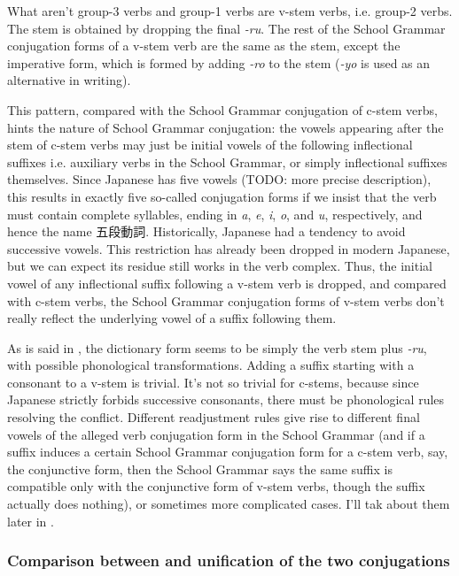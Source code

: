 \documentclass[UTF8, a4paper, oneside, scheme=plain]{ctexart}
\newcommand{\corpus}[1]{\emph{#1}}
\begin{document}
What aren't group-3 verbs and group-1 verbs are v-stem verbs, i.e. group-2 verbs.
The stem is obtained by dropping the final \corpus{-ru}.
The rest of the School Grammar conjugation forms of a v-stem verb are the same as the stem,
except the imperative form,
which is formed by adding \corpus{-ro} to the stem 
(\corpus{-yo} is used as an alternative in writing).

This pattern, compared with the School Grammar conjugation of c-stem verbs, 
hints the nature of School Grammar conjugation:
the vowels appearing after the stem of c-stem verbs 
may just be initial vowels of the following inflectional suffixes 
i.e. auxiliary verbs in the School Grammar,
or simply inflectional suffixes themselves.
Since Japanese has five vowels (TODO: more precise description),
this results in exactly five so-called conjugation forms
if we insist that the verb must contain complete syllables,
ending in \corpus{a}, \corpus{e}, \corpus{i}, \corpus{o}, and \corpus{u}, respectively,
and hence the name 五段動詞.
Historically, Japanese had a tendency to avoid successive vowels.
This restriction has already been dropped in modern Japanese,
but we can expect its residue still works in the verb complex.
Thus, the initial vowel of any inflectional suffix following a v-stem verb is dropped,
and compared with c-stem verbs,
the School Grammar conjugation forms of v-stem verbs 
don't really reflect the underlying vowel of a suffix following them.

As is said in ,
the dictionary form seems to be simply the verb stem plus \corpus{-ru},
with possible phonological transformations.
Adding a suffix starting with a consonant to a v-stem is trivial.
It's not so trivial for c-stems,
because since Japanese strictly forbids successive consonants,
there must be phonological rules resolving the conflict.
Different readjustment rules give rise to different final vowels 
of the alleged verb conjugation form in the School Grammar
(and if a suffix induces a certain School Grammar conjugation form for a c-stem verb,
say, the conjunctive form,
then the School Grammar says the same suffix is compatible only with the conjunctive form of v-stem verbs,
though the suffix actually does nothing),
or sometimes more complicated cases.
I'll tak about them later in .

\subsubsection{Comparison between and unification of the two conjugations}\label{sec:conjugation-compare}
\end{document}
